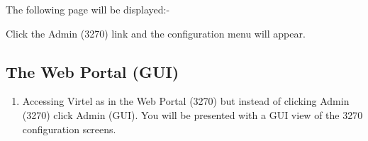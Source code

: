 \documentclass[letterpaper,10pt,english]{sphinxmanual}
\begin{document}
\begin{sphinxVerbatim}[commandchars=\\\{\}]
\end{sphinxVerbatim}

The following page will be displayed:-


Click the Admin (3270) link and the configuration menu will appear.


\newpage


\subsection{The Web Portal (GUI)}
\label{\detokenize{connectivity_guide:the-web-portal-gui}}\begin{enumerate}
\def\theenumi{\arabic{enumi}}
\def\labelenumi{\theenumi .}
\makeatletter\def\p@enumii{\p@enumi \theenumi .}\makeatother
\setcounter{enumi}{2}
\item {} 
Accessing Virtel as in the Web Portal (3270) but instead of clicking Admin (3270) click Admin (GUI). You will be presented with a GUI view of the 3270 configuration screens.

\end{enumerate}


\newpage
\end{document}
